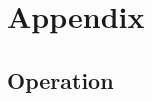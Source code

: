 %
%





\renewcommand\thesection{\Alph{section}}
\renewcommand\thefigure{\thesection.\arabic{figure}}
\renewcommand{\thetable}{\thesection.\arabic{table}}
\setcounter{figure}{0}
\setcounter{table}{0}
\setcounter{section}{0}

\chapter*{Appendix}

\label{chap:Appendix}

\section{Operation}


